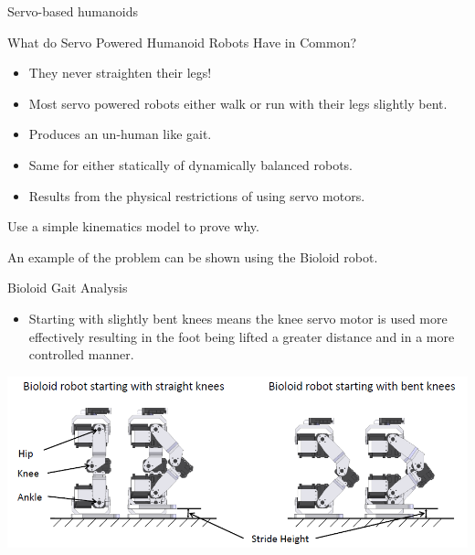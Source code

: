 \documentclass[compress]{beamer}
\begin{document}
\begin{frame}{Servo-based humanoids}

    What do Servo Powered Humanoid Robots Have in Common?

    \begin{itemize}

        \item They never straighten their legs!
        \item Most servo powered robots either walk or run with their legs slightly
            bent.
        \item Produces an un-human like gait.
        \item Same for either statically of dynamically balanced robots.
        \item Results from the physical restrictions of using servo motors.
    \end{itemize}

    Use a simple kinematics model to prove why.

    An example of the problem can be shown using the Bioloid robot.

\end{frame}

\begin{frame}{Bioloid Gait Analysis}

    \begin{itemize}

        \item Starting with slightly bent knees means the knee servo motor is used
            more effectively resulting in the foot being lifted a greater distance
            and in a more controlled manner.
    \end{itemize}

    \begin{center}
        \includegraphics[width=0.8\linewidth]{image35}
    \end{center}
\end{frame}
\end{document}
